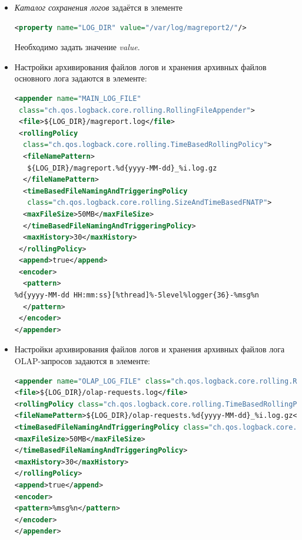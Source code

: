 \documentclass[../user-manual.tex]{subfiles}
\begin{document}
	\begin{itemize}
		\item \textit{Каталог сохранения логов} задаётся в элементе
		
		\begin{lstlisting}[language=XML]
<property name="LOG_DIR" value="/var/log/magreport2/"/>
		\end{lstlisting}
		
		Необходимо задать значение \textit{value}.
		
		\item Настройки архивирования файлов логов и хранения архивных файлов основного лога задаются в элементе:
		
		\begin{lstlisting}[language=XML]
<appender name="MAIN_LOG_FILE" 
 class="ch.qos.logback.core.rolling.RollingFileAppender">
 <file>${LOG_DIR}/magreport.log</file>
 <rollingPolicy 
  class="ch.qos.logback.core.rolling.TimeBasedRollingPolicy">
  <fileNamePattern>
   ${LOG_DIR}/magreport.%d{yyyy-MM-dd}_%i.log.gz
  </fileNamePattern>
  <timeBasedFileNamingAndTriggeringPolicy 
   class="ch.qos.logback.core.rolling.SizeAndTimeBasedFNATP">
  <maxFileSize>50MB</maxFileSize>
  </timeBasedFileNamingAndTriggeringPolicy>
  <maxHistory>30</maxHistory>
 </rollingPolicy>
 <append>true</append>
 <encoder>
  <pattern>
%d{yyyy-MM-dd HH:mm:ss}[%thread]%-5level%logger{36}-%msg%n
  </pattern>
 </encoder>
</appender>
		\end{lstlisting}
	
	\item Настройки  архивирования файлов логов и хранения архивных файлов лога OLAP-запросов задаются в элементе:
	
	\begin{lstlisting}[language=XML]
<appender name="OLAP_LOG_FILE" class="ch.qos.logback.core.rolling.RollingFileAppender">
<file>${LOG_DIR}/olap-requests.log</file>
<rollingPolicy class="ch.qos.logback.core.rolling.TimeBasedRollingPolicy">
<fileNamePattern>${LOG_DIR}/olap-requests.%d{yyyy-MM-dd}_%i.log.gz</fileNamePattern>
<timeBasedFileNamingAndTriggeringPolicy class="ch.qos.logback.core.rolling.SizeAndTimeBasedFNATP">
<maxFileSize>50MB</maxFileSize>
</timeBasedFileNamingAndTriggeringPolicy>
<maxHistory>30</maxHistory>
</rollingPolicy>
<append>true</append>
<encoder>
<pattern>%msg%n</pattern>
</encoder>
</appender>
\end{lstlisting}

	
	\end{itemize}
\end{document}
